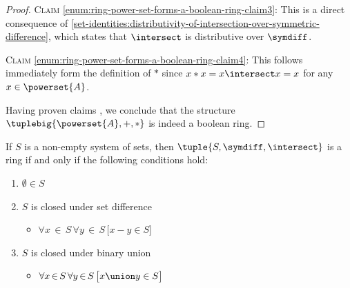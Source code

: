 \begin{proof}
    \vspace{0.5cm}
    \noindent
    \textsc{Claim} \ref{enum:ring-power-set-forms-a-boolean-ring-claim3}:
    This is a direct consequence of \cref{set-identities:distributivity-of-intersection-over-symmetric-difference}, which states that
    \( \intersect \) is distributive over \( \symdiff \).

    \vspace{0.5cm}
    \noindent
    \textsc{Claim} \ref{enum:ring-power-set-forms-a-boolean-ring-claim4}:
    This follows immediately form the definition of \( \ast \) since \( x \ast x = x \intersect x = x \) for any \( x \in \powerset{A} \).

    \vspace{0.5cm}
    \noindent
    Having proven claims , we
    conclude that the structure \( \tuplebig{\powerset{A},+,\ast} \) is indeed a boolean ring.
\end{proof}

\begin{thm}
    \label{thm:ring-system-of-sets-forms-a-ring-iff-it-contains-the-empty-set-and-is-closed-under-union-and-set-diff}
    If \( S \) is a non-empty system of sets, then \( \tuple{S, \symdiff, \intersect} \) is a ring if and only if the following conditions hold:
    \begin{enumerate}[topsep=2pt,noitemsep,label=\textup{\texttt{(\alph*)}}]
        \item \( \emptyset \in S \) \label{enum:ring-empty-set-is-in-the-system-of-sets}
        \item \( S \) is closed under set difference
            \begin{itemize}
                \item \( \forall x\,{\in}\,S \, \forall y\,{\in}\,S \, \big[ x - y \in S \big] \)
            \end{itemize} \label{enum:ring-closure-under-set-diff}
        \item \( S \) is closed under binary union
            \begin{itemize}
                \item \( \forall x\,{\in}\,S \, \forall y\,{\in}\,S \, \big[ x \union y \in S \big] \)
            \end{itemize} \label{enum:ring-closure-under-binary-union}
    \end{enumerate}
\end{thm}

